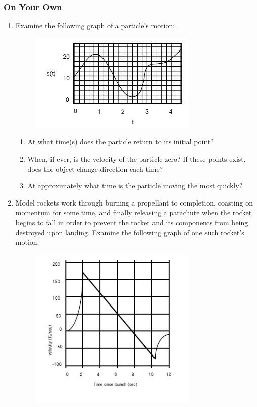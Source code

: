 \documentclass{ximera}
\begin{document}
\subsubsection{On Your Own}
\begin{enumerate}
\item{Examine the following graph of a particle's motion:}
\begin{figure}
	\centering
    \includegraphics[width=80mm]{position.png}
\end{figure}
\begin{enumerate}
\item{At what time(s) does the particle return to its initial point?}
\item{When, if ever, is the velocity of the particle zero? If these points exist, does the object change direction each time?}
\item{At approximately what time is the particle moving the most quickly?}
\end{enumerate}
\item{Model rockets work through burning a propellant to completion, coasting on momentum for some time, and finally releasing a parachute when the rocket begins to fall in order to prevent the rocket and its components from being destroyed upon landing. Examine the following graph of one such rocket's motion:}
\begin{figure}[H]
	\centering
    \includegraphics[width=80mm]{rocket.png}

\end{figure}
\end{enumerate}
\end{document}
